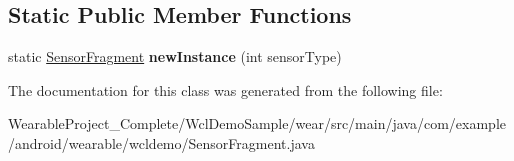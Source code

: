 \subsection*{Static Public Member Functions}
\begin{DoxyCompactItemize}
\item 
static \hyperlink{classcom_1_1example_1_1android_1_1wearable_1_1wcldemo_1_1SensorFragment}{Sensor\+Fragment} {\bfseries new\+Instance} (int sensor\+Type)\hypertarget{classcom_1_1example_1_1android_1_1wearable_1_1wcldemo_1_1SensorFragment_a05ddd04f93e04dcf87893f6d1e46edde}{}\label{classcom_1_1example_1_1android_1_1wearable_1_1wcldemo_1_1SensorFragment_a05ddd04f93e04dcf87893f6d1e46edde}

\end{DoxyCompactItemize}


The documentation for this class was generated from the following file\+:\begin{DoxyCompactItemize}
\item 
Wearable\+Project\+\_\+\+Complete/\+Wcl\+Demo\+Sample/wear/src/main/java/com/example/android/wearable/wcldemo/Sensor\+Fragment.\+java\end{DoxyCompactItemize}
